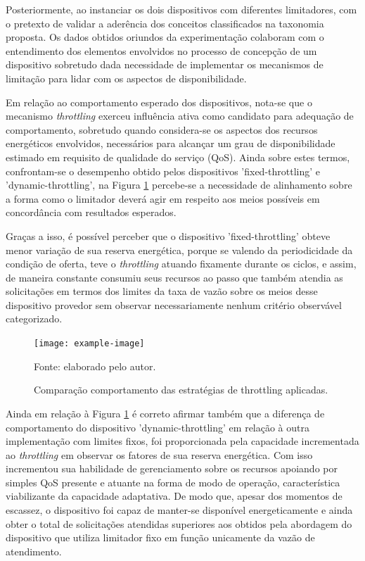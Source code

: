 Posteriormente, ao instanciar os dois dispositivos com diferentes limitadores, com o pretexto de validar a aderência dos conceitos classificados na taxonomia proposta. Os dados obtidos oriundos da experimentação colaboram com o entendimento dos elementos envolvidos no processo de concepção de um dispositivo sobretudo dada necessidade de implementar os mecanismos de limitação para lidar com os aspectos de disponibilidade.

Em relação ao comportamento esperado dos dispositivos, nota-se que o mecanismo \textit{throttling} exerceu influência ativa como candidato para adequação de comportamento, sobretudo quando considera-se os aspectos dos recursos energéticos envolvidos, necessários para alcançar um grau de disponibilidade estimado em requisito de qualidade do serviço (\acl{QoS}). Ainda sobre estes termos, confrontam-se o desempenho obtido pelos dispositivos 'fixed-throttling' e 'dynamic-throttling', na Figura \ref{fig:cap6fixedxdynamic} percebe-se a necessidade de alinhamento sobre a forma como o limitador deverá agir em respeito aos meios possíveis em concordância com resultados esperados.

Graças a isso, é possível perceber que o dispositivo 'fixed-throttling' obteve menor variação de sua reserva energética, porque se valendo da periodicidade da condição de oferta, teve o \textit{throttling} atuando fixamente durante os ciclos, e assim, de maneira constante consumiu seus recursos ao passo que também atendia as solicitações em termos dos limites da taxa de vazão sobre os meios desse dispositivo provedor sem observar necessariamente nenhum critério observável categorizado. 
 
\begingroup
\begin{figure}[htb]
	
	\centering
	\caption{Comparação comportamento das estratégias de throttling aplicadas.}
	\label{fig:cap6fixedxdynamic}
	\noindent\texttt{[image: example-image]} 
	
	Fonte: elaborado pelo autor.
\end{figure}
\endgroup

Ainda em relação à Figura \ref{fig:cap6fixedxdynamic} é correto afirmar também que a diferença de comportamento do dispositivo 'dynamic-throttling' em relação à outra implementação com limites fixos, foi proporcionada pela capacidade incrementada ao \textit{throttling} em observar os fatores de sua reserva energética. Com isso incrementou sua habilidade de gerenciamento sobre os recursos apoiando por simples \acs{QoS} presente e atuante na forma de modo de operação, característica viabilizante da capacidade adaptativa. De modo que, apesar dos momentos de escassez, o dispositivo foi capaz de manter-se disponível energeticamente e ainda obter o total de solicitações atendidas superiores aos obtidos pela abordagem do dispositivo que utiliza limitador fixo em função unicamente da vazão de atendimento.
 

